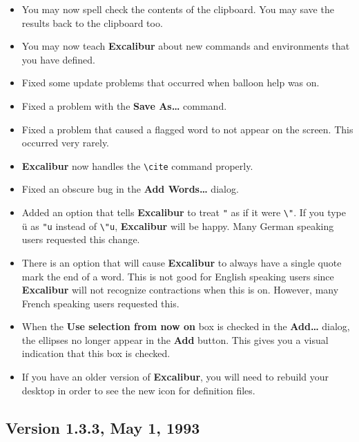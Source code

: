 \documentclass[11pt,titlepage]{article}
\newcommand{\ex}{\textbf{Excalibur}}
\begin{document}
\begin{itemize}

\item You may now spell check the contents of the clipboard.  You may
  save the results back to the clipboard too.

\item You may now teach \ex{} about new commands and environments that
  you have defined.

\item Fixed some update problems that occurred when balloon help was
  on.

\item Fixed a problem with the \textbf{Save As\ldots} command.

\item Fixed a problem that caused a flagged word to not appear on the
  screen.  This occurred very rarely.

\item \ex{} now handles the \verb+\cite+ command properly.

\item Fixed an obscure bug in the \textbf{Add Words\ldots} dialog.

\item Added an option that tells \ex{} to treat \texttt{"} as if it
  were \verb+\"+.  If you type \"u as \verb+"u+ instead of \verb+\"u+,
  \ex{} will be happy.  Many German speaking users requested this
  change.

\item There is an option that will cause \ex{} to always have a single
  quote mark the end of a word.  This is not good for English speaking
  users since \ex{} will not recognize contractions when this is on.
  However, many French speaking users requested this.

\item When the \textbf{Use selection from now on} box is checked in
  the \textbf{Add\ldots} dialog, the ellipses no longer appear in
  the \textbf{Add} button.  This gives you a visual indication that
  this box is checked.

\item If you have an older version of \ex{}, you will need to
  rebuild your desktop in order to see the new icon for definition
  files.
\end{itemize}

\subsection{Version 1.3.3, May 1, 1993}
\end{document}
